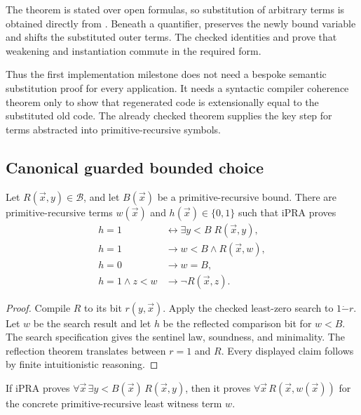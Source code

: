 The theorem is stated over open formulas, so substitution of arbitrary terms is obtained directly from .  Beneath a quantifier,  preserves the newly bound variable and shifts the substituted outer terms.  The checked identities  and  prove that weakening and instantiation commute in the required form.

Thus the first implementation milestone does not need a bespoke semantic substitution proof for every application.  It needs a syntactic compiler coherence theorem only to show that regenerated code is extensionally equal to the substituted old code.  The already checked  theorem supplies the key step for terms abstracted into primitive-recursive symbols.

\subsection{Canonical guarded bounded choice}

\begin{theorem}
\label{thm:least-accepted}
Let \(R(\vec x,y)\in\mathcal B\), and let \(B(\vec x)\) be a primitive-recursive bound.  There are primitive-recursive terms \(w(\vec x)\) and \(h(\vec x)\in\{0,1\}\) such that iPRA proves
\[
\begin{aligned}
 h=1 &\leftrightarrow \exists y<B\;R(\vec x,y),\\
 h=1 &\to w<B\wedge R(\vec x,w),\\
 h=0 &\to w=B,\\
 h=1\wedge z<w &\to \neg R(\vec x,z).
\end{aligned}
\]
\end{theorem}
\begin{proof}
Compile \(R\) to its bit \(r(y,\vec x)\).  Apply the checked least-zero search to \(1\mathbin{\dot-}r\).  Let \(w\) be the search result and let \(h\) be the reflected comparison bit for \(w<B\).  The search specification gives the sentinel law, soundness, and minimality.  The reflection theorem translates between \(r=1\) and \(R\).  Every displayed claim follows by finite intuitionistic reasoning.
\end{proof}

\begin{corollary}
If iPRA proves \(\forall\vec x\,\exists y<B(\vec x)\,R(\vec x,y)\), then it proves \(\forall\vec x\,R(\vec x,w(\vec x))\) for the concrete primitive-recursive least witness term \(w\).
\end{corollary}

